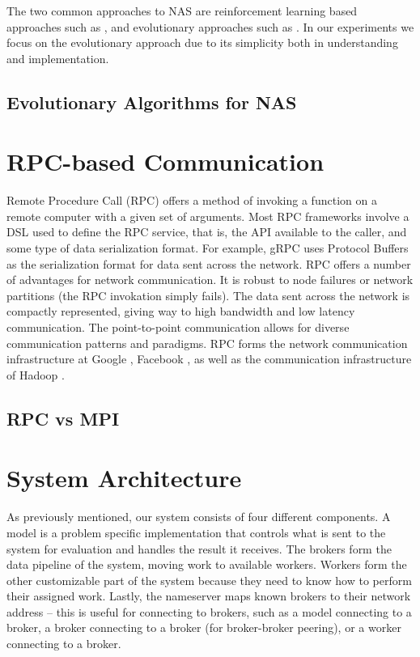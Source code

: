 \documentclass[conference]{IEEEtran}
\begin{document}
The two common approaches to NAS are reinforcement learning based approaches such
as \cite{45826, Kyriakides:2018:NAS:3200947.3208068, pmlr-v80-pham18a}, and
evolutionary approaches such as \cite{DBLP:journals/corr/abs-1711-00436,
  DBLP:journals/corr/MiikkulainenLMR17, DBLP:conf/icml/RealMSSSTLK17}. In our
experiments we focus on the evolutionary approach due to its simplicity both in
understanding and implementation.

\subsection{Evolutionary Algorithms for NAS}


\section{RPC-based Communication}
Remote Procedure Call (RPC) offers a method of invoking a function on a remote
computer with a given set of arguments. Most RPC frameworks involve a DSL used
to define the RPC service, that is, the API available to the caller, and some
type of data serialization format. For example, gRPC uses Protocol Buffers
\cite{Varda2008} as the serialization format for data sent across the network.
RPC offers a number of advantages for network communication. It is robust to
node failures or network partitions (the RPC invokation simply fails). The data
sent across the network is compactly represented, giving way to high bandwidth
and low latency communication. The point-to-point communication allows for
diverse communication patterns and paradigms. RPC forms the network communication
infrastructure at Google \cite{van2017production}, Facebook \cite{Slee2007},
as well as the communication infrastructure of Hadoop
\cite{Shvachko:2010:HDF:1913798.1914427, Lu:2013:HDH:2570457.2571128}.

\subsection{RPC vs MPI}

\section{System Architecture}
As previously mentioned, our system consists of four different components. A model
is a problem specific implementation that controls what is sent to the system for
evaluation and handles the result it receives. The brokers form the data pipeline
of the system, moving work to available workers. Workers form the other customizable
part of the system because they need to know how to perform their assigned work.
Lastly, the nameserver maps known brokers to their network address -- this is useful
for connecting to brokers, such as a model connecting to a broker, a broker connecting
to a broker (for broker-broker peering), or a worker connecting to a broker.
\end{document}

